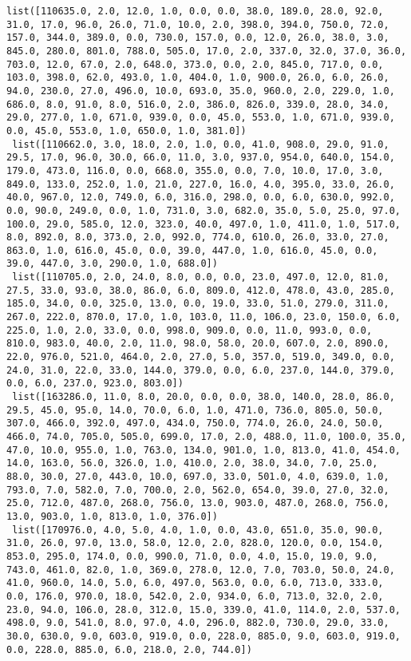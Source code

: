 \documentclass[11pt]{article}
\begin{document}
\begin{Verbatim}[commandchars=\\\{\}]
 list([110635.0, 2.0, 12.0, 1.0, 0.0, 0.0, 38.0, 189.0, 28.0, 92.0, 31.0, 17.0, 96.0, 26.0, 71.0, 10.0, 2.0, 398.0, 394.0, 750.0, 72.0, 157.0, 344.0, 389.0, 0.0, 730.0, 157.0, 0.0, 12.0, 26.0, 38.0, 3.0, 845.0, 280.0, 801.0, 788.0, 505.0, 17.0, 2.0, 337.0, 32.0, 37.0, 36.0, 703.0, 12.0, 67.0, 2.0, 648.0, 373.0, 0.0, 2.0, 845.0, 717.0, 0.0, 103.0, 398.0, 62.0, 493.0, 1.0, 404.0, 1.0, 900.0, 26.0, 6.0, 26.0, 94.0, 230.0, 27.0, 496.0, 10.0, 693.0, 35.0, 960.0, 2.0, 229.0, 1.0, 686.0, 8.0, 91.0, 8.0, 516.0, 2.0, 386.0, 826.0, 339.0, 28.0, 34.0, 29.0, 277.0, 1.0, 671.0, 939.0, 0.0, 45.0, 553.0, 1.0, 671.0, 939.0, 0.0, 45.0, 553.0, 1.0, 650.0, 1.0, 381.0])
 list([110662.0, 3.0, 18.0, 2.0, 1.0, 0.0, 41.0, 908.0, 29.0, 91.0, 29.5, 17.0, 96.0, 30.0, 66.0, 11.0, 3.0, 937.0, 954.0, 640.0, 154.0, 179.0, 473.0, 116.0, 0.0, 668.0, 355.0, 0.0, 7.0, 10.0, 17.0, 3.0, 849.0, 133.0, 252.0, 1.0, 21.0, 227.0, 16.0, 4.0, 395.0, 33.0, 26.0, 40.0, 967.0, 12.0, 749.0, 6.0, 316.0, 298.0, 0.0, 6.0, 630.0, 992.0, 0.0, 90.0, 249.0, 0.0, 1.0, 731.0, 3.0, 682.0, 35.0, 5.0, 25.0, 97.0, 100.0, 29.0, 585.0, 12.0, 323.0, 40.0, 497.0, 1.0, 411.0, 1.0, 517.0, 8.0, 892.0, 8.0, 373.0, 2.0, 992.0, 774.0, 610.0, 26.0, 33.0, 27.0, 863.0, 1.0, 616.0, 45.0, 0.0, 39.0, 447.0, 1.0, 616.0, 45.0, 0.0, 39.0, 447.0, 3.0, 290.0, 1.0, 688.0])
 list([110705.0, 2.0, 24.0, 8.0, 0.0, 0.0, 23.0, 497.0, 12.0, 81.0, 27.5, 33.0, 93.0, 38.0, 86.0, 6.0, 809.0, 412.0, 478.0, 43.0, 285.0, 185.0, 34.0, 0.0, 325.0, 13.0, 0.0, 19.0, 33.0, 51.0, 279.0, 311.0, 267.0, 222.0, 870.0, 17.0, 1.0, 103.0, 11.0, 106.0, 23.0, 150.0, 6.0, 225.0, 1.0, 2.0, 33.0, 0.0, 998.0, 909.0, 0.0, 11.0, 993.0, 0.0, 810.0, 983.0, 40.0, 2.0, 11.0, 98.0, 58.0, 20.0, 607.0, 2.0, 890.0, 22.0, 976.0, 521.0, 464.0, 2.0, 27.0, 5.0, 357.0, 519.0, 349.0, 0.0, 24.0, 31.0, 22.0, 33.0, 144.0, 379.0, 0.0, 6.0, 237.0, 144.0, 379.0, 0.0, 6.0, 237.0, 923.0, 803.0])
 list([163286.0, 11.0, 8.0, 20.0, 0.0, 0.0, 38.0, 140.0, 28.0, 86.0, 29.5, 45.0, 95.0, 14.0, 70.0, 6.0, 1.0, 471.0, 736.0, 805.0, 50.0, 307.0, 466.0, 392.0, 497.0, 434.0, 750.0, 774.0, 26.0, 24.0, 50.0, 466.0, 74.0, 705.0, 505.0, 699.0, 17.0, 2.0, 488.0, 11.0, 100.0, 35.0, 47.0, 10.0, 955.0, 1.0, 763.0, 134.0, 901.0, 1.0, 813.0, 41.0, 454.0, 14.0, 163.0, 56.0, 326.0, 1.0, 410.0, 2.0, 38.0, 34.0, 7.0, 25.0, 88.0, 30.0, 27.0, 443.0, 10.0, 697.0, 33.0, 501.0, 4.0, 639.0, 1.0, 793.0, 7.0, 582.0, 7.0, 700.0, 2.0, 562.0, 654.0, 39.0, 27.0, 32.0, 25.0, 712.0, 487.0, 268.0, 756.0, 13.0, 903.0, 487.0, 268.0, 756.0, 13.0, 903.0, 1.0, 813.0, 1.0, 376.0])
 list([170976.0, 4.0, 5.0, 4.0, 1.0, 0.0, 43.0, 651.0, 35.0, 90.0, 31.0, 26.0, 97.0, 13.0, 58.0, 12.0, 2.0, 828.0, 120.0, 0.0, 154.0, 853.0, 295.0, 174.0, 0.0, 990.0, 71.0, 0.0, 4.0, 15.0, 19.0, 9.0, 743.0, 461.0, 82.0, 1.0, 369.0, 278.0, 12.0, 7.0, 703.0, 50.0, 24.0, 41.0, 960.0, 14.0, 5.0, 6.0, 497.0, 563.0, 0.0, 6.0, 713.0, 333.0, 0.0, 176.0, 970.0, 18.0, 542.0, 2.0, 934.0, 6.0, 713.0, 32.0, 2.0, 23.0, 94.0, 106.0, 28.0, 312.0, 15.0, 339.0, 41.0, 114.0, 2.0, 537.0, 498.0, 9.0, 541.0, 8.0, 97.0, 4.0, 296.0, 882.0, 730.0, 29.0, 33.0, 30.0, 630.0, 9.0, 603.0, 919.0, 0.0, 228.0, 885.0, 9.0, 603.0, 919.0, 0.0, 228.0, 885.0, 6.0, 218.0, 2.0, 744.0])

\end{Verbatim}
\end{document}
